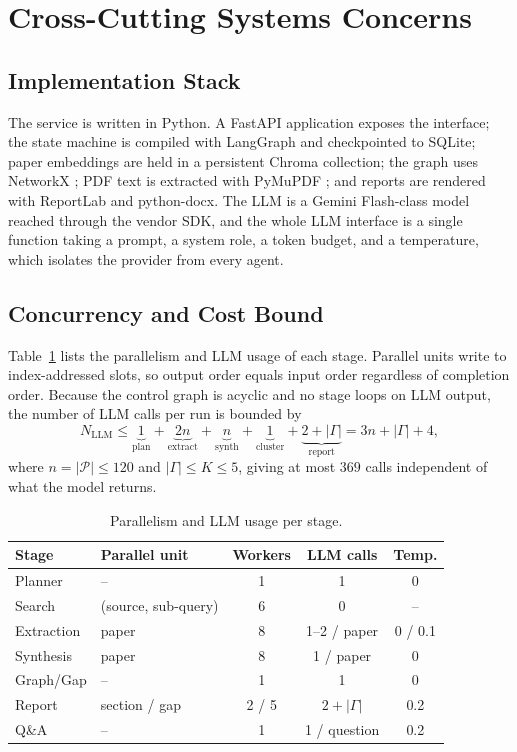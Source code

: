\documentclass[conference]{IEEEtran}
\newcommand{\cP}{\mathcal{P}}
\begin{document}
\section{Cross-Cutting Systems Concerns}
\label{sec:sys}

\subsection{Implementation Stack}
The service is written in Python. A FastAPI \cite{fastapi} application exposes the interface; the state machine is compiled with LangGraph \cite{langgraph} and checkpointed to SQLite; paper embeddings are held in a persistent Chroma \cite{chroma} collection; the graph uses NetworkX \cite{hagberg2008networkx}; PDF text is extracted with PyMuPDF \cite{pymupdf}; and reports are rendered with ReportLab and python-docx. The LLM is a Gemini Flash-class model reached through the vendor SDK, and the whole LLM interface is a single function taking a prompt, a system role, a token budget, and a temperature, which isolates the provider from every agent.

\subsection{Concurrency and Cost Bound}
Table~\ref{tab:ops} lists the parallelism and LLM usage of each stage. Parallel units write to index-addressed slots, so output order equals input order regardless of completion order. Because the control graph is acyclic and no stage loops on LLM output, the number of LLM calls per run is bounded by
\begin{equation}
N_{\mathrm{LLM}}\le\underbrace{1}_{\text{plan}}+\underbrace{2n}_{\text{extract}}+\underbrace{n}_{\text{synth}}+\underbrace{1}_{\text{cluster}}+\underbrace{2+|\Gamma|}_{\text{report}}=3n+|\Gamma|+4,
\label{eq:calls}
\end{equation}
where $n=|\cP|\le120$ and $|\Gamma|\le K\le5$, giving at most $369$ calls independent of what the model returns.

\begin{table}[!t]
\caption{Parallelism and LLM usage per stage.}
\label{tab:ops}
\centering
\small
\setlength{\tabcolsep}{3.5pt}
\begin{tabular}{@{}llccc@{}}
\toprule
Stage & Parallel unit & Workers & LLM calls & Temp. \\
\midrule
Planner    & --                      & 1   & 1            & 0 \\
Search     & (source, sub-query)     & 6   & 0            & -- \\
Extraction & paper                   & 8   & 1--2 / paper & 0 / 0.1 \\
Synthesis  & paper                   & 8   & 1 / paper    & 0 \\
Graph/Gap  & --                      & 1   & 1            & 0 \\
Report     & section / gap           & 2 / 5 & $2+|\Gamma|$ & 0.2 \\
Q\&A       & --                      & 1   & 1 / question & 0.2 \\
\bottomrule
\end{tabular}
\end{table}
\end{document}
